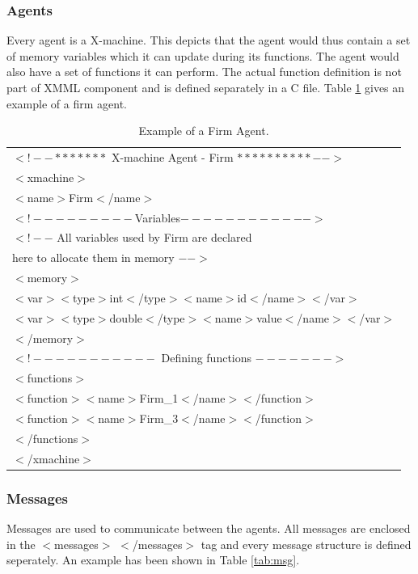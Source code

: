 \documentclass[a4paper,11pt]{article}
\begin{document}
\subsubsection{Agents}

Every agent is a X-machine. This depicts that the agent would thus
contain a set of memory variables which it can update during its
functions. The agent would also have a set of functions it can
perform. The actual function definition is not part of XMML
component and is defined separately in a C file. Table
\ref{tab:firmdata} gives an example of a firm agent.


\begin{table}
\centering %
\begin{tabular}{|l|}
\hline $<!--*******$ X-machine Agent - Firm $**********-->$\\
$<$xmachine$>$\\
$<$name$>$Firm$<$/name$>$ \\
$<!---------$Variables$------------>$\\
$<!--$ All variables used by Firm are declared\\
here to allocate them in memory $-->$\\
$<$memory$>$ \\
$<$var$><$type$>$int$<$/type$><$name$>$id$<$/name$><$/var$>$\\
$<$var$><$type$>$double$<$/type$><$name$>$value$<$/name$><$/var$>$\\
$<$/memory$>$\\ $<!-----------$ Defining functions
$------->$\\
$<$functions$>$\\
$<$function$><$name$>$Firm\_1$<$/name$><$/function$>$\\
$<$function$><$name$>$Firm\_3$<$/name$><$/function$>$\\
$<$/functions$>$ \\$<$/xmachine$>$\\
 \hline
\end{tabular}
\caption{Example of a Firm Agent.} \label{tab:firmdata}
\end{table}

\subsubsection{Messages}
Messages are used to communicate between the agents. All messages
are enclosed in the $<$messages$>$ $<$/messages$>$ tag and every
message structure is defined seperately. An example has been shown
in Table \ref{tab:msg}.
\end{document}
